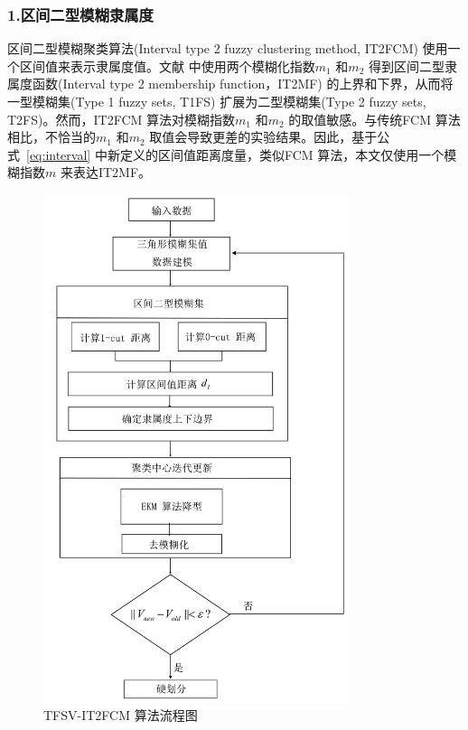 \subsubsection*{1.区间二型模糊隶属度}
\label{subsec::chap03-3-3-2-1}
区间二型模糊聚类算法(Interval type 2 fuzzy clustering method, IT2FCM) 使用一个区间值来表示隶属度值。文献\cite{hwang2007uncertain} 中使用两个模糊化指数$m_1$ 和$m_2$ 得到区间二型隶属度函数(Interval type 2 membership function，IT2MF) 的上界和下界，从而将一型模糊集(Type 1 fuzzy sets, T1FS) 扩展为二型模糊集(Type 2 fuzzy sets, T2FS)。然而，IT2FCM 算法对模糊指数$m_1$ 和$m_2$ 的取值敏感。与传统FCM 算法相比，不恰当的$m_1$ 和$m_2$ 取值会导致更差的实验结果。因此，基于公式~\ref{eq:interval} 中新定义的区间值距离度量，类似FCM 算法，本文仅使用一个模糊指数$m$ 来表达IT2MF。


\begin{figure}[htbp]
    \centering
    \includegraphics[width=0.8\textwidth]{figures/tfsvit2}
    \caption{TFSV-IT2FCM 算法流程图}\label{fig:tfsvit2}
  \end{figure}


